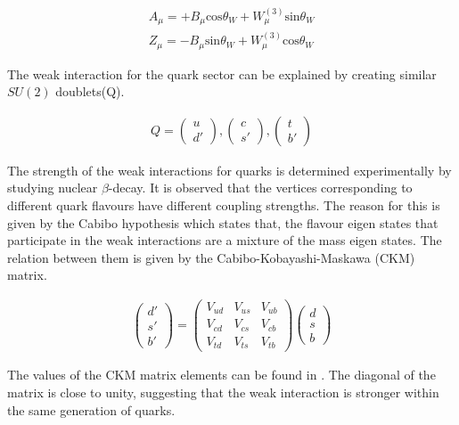 \begin{align}
A_\mu = +B_\mu \text{cos} \theta_W + W_\mu^{(3)}\text{sin} \theta_W \\
Z_\mu = -B_\mu \text{sin} \theta_W + W_\mu^{(3)}\text{cos} \theta_W 
\end{align}

The weak interaction for the quark sector can be explained by creating similar
$SU(2)$ doublets(Q).

\begin{align}
    Q = \begin{pmatrix} u \\ d' \end{pmatrix}, \begin{pmatrix} c \\ s' \end{pmatrix}, \begin{pmatrix} t \\ b' \end{pmatrix}
\end{align}

The strength of the weak interactions for quarks is determined experimentally by studying
nuclear $\beta$-decay. It is observed that the vertices corresponding to different quark
flavours have different coupling strengths. The reason for this is given by the Cabibo
hypothesis which states that, the flavour eigen states that participate in the weak interactions
are a mixture of the mass eigen states. The relation between them is given by the 
Cabibo-Kobayashi-Maskawa (CKM) matrix. 

\begin{align}
    \begin{pmatrix} d' \\ s' \\ b'\end{pmatrix}
     = \begin{pmatrix} V_{ud} & V_{us} & V_{ub} \\
                       V_{cd} & V_{cs} & V_{cb} \\
                       V_{td} & V_{ts} & V_{tb}
    \end{pmatrix} \begin{pmatrix} d \\ s \\ b\end{pmatrix}
\end{align}

The values of the CKM matrix elements can be found in \cite{Navas:2024zbs}. The diagonal
of the matrix is close to unity, suggesting that the weak interaction is stronger within
the same generation of quarks. 

